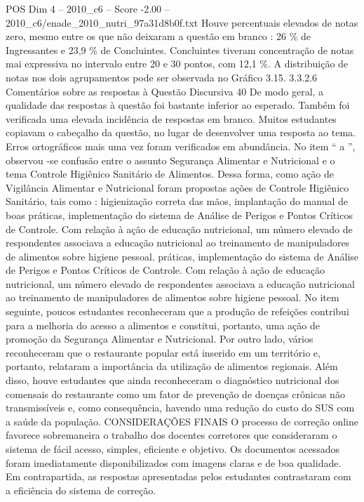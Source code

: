 \begin{textsample}{POS Dim 4 – 2010\_c6 – Score -2.00 – 2010\_c6/enade\_2010\_nutri\_97a31d8b0f.txt}
Houve percentuais elevados de notas zero, mesmo entre os que não deixaram a questão em branco : 26 \% de Ingressantes e 23,9 \% de Concluintes.
Concluintes tiveram concentração de notas mai expressiva no intervalo entre 20 e 30 pontos, com 12,1 \%.
A distribuição de notas nos dois agrupamentos pode ser observada no Gráfico 3.15. 3.3.2.6 Comentários sobre as respostas à Questão Discursiva 40 De modo geral, a qualidade das respostas à questão foi bastante inferior ao esperado.
Também foi verificada uma elevada incidência de respostas em branco.
Muitos estudantes copiavam o cabeçalho da questão, no lugar de desenvolver uma resposta ao tema.
Erros ortográficos mais uma vez foram verificados em abundância.
No item “ a ”, observou -se confusão entre o assunto Segurança Alimentar e Nutricional e o tema Controle Higiênico Sanitário de Alimentos.
Dessa forma, como ação de Vigilância Alimentar e Nutricional foram propostas ações de Controle Higiênico Sanitário, tais como : higienização correta das mãos, implantação do manual de boas práticas, implementação do sistema de Análise de Perigos e Pontos Críticos de Controle.
Com relação à ação de educação nutricional, um número elevado de respondentes associava a educação nutricional ao treinamento de manipuladores de alimentos sobre higiene pessoal. práticas, implementação do sistema de Análise de Perigos e Pontos Críticos de Controle.
Com relação à ação de educação nutricional, um número elevado de respondentes associava a educação nutricional ao treinamento de manipuladores de alimentos sobre higiene pessoal.
No item seguinte, poucos estudantes reconheceram que a produção de refeições contribui para a melhoria do acesso a alimentos e constitui, portanto, uma ação de promoção da Segurança Alimentar e Nutricional.
Por outro lado, vários reconheceram que o restaurante popular está inserido em um território e, portanto, relataram a importância da utilização de alimentos regionais.
Além disso, houve estudantes que ainda reconheceram o diagnóstico nutricional dos comensais do restaurante como um fator de prevenção de doenças crônicas não transmissíveis e, como consequência, havendo uma redução do custo do SUS com a saúde da população.
CONSIDERAÇÕES FINAIS O processo de correção online favorece sobremaneira o trabalho dos docentes corretores que consideraram o sistema de fácil acesso, simples, eficiente e objetivo.
Os documentos acessados foram imediatamente disponibilizados com imagens claras e de boa qualidade.
Em contrapartida, as respostas apresentadas pelos estudantes contrastaram com a eficiência do sistema de correção.

\end{textsample}
